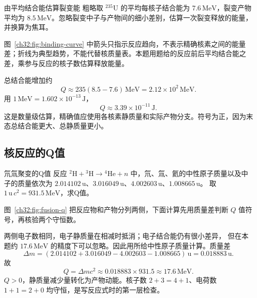 \begin{origexamplebox}{由平均结合能估算裂变能}
粗略取 $^{235}\mathrm U$ 的平均每核子结合能为 $7.6\,\mathrm{MeV}$，裂变产物平均为
$8.5\,\mathrm{MeV}$。忽略裂变中子与产物间的细小差别，估算一次裂变释放的能量，并换算为焦耳。
\end{origexamplebox}
\begin{xesolution}

\begin{center}

\label{ch32:fig:binding-curve}
\end{center}
图~\ref{ch32:fig:binding-curve} 中箭头只指示反应趋向，不表示精确核素之间的能量差；折线为典型趋势，不能代替核质量表。本题用题给的反应前后平均结合能之差，乘参与反应的核子数估算释放能量。


总结合能增加约
\[
 Q\approx235(8.5-7.6)\,\mathrm{MeV}
 =\boxed{2.12\times10^2\,\mathrm{MeV}}.
\]
用 $1\,\mathrm{MeV}=1.602\times10^{-13}\,\mathrm J$，
\[
 \boxed{Q\approx3.39\times10^{-11}\,\mathrm J}.
\]
这是数量级估算，精确值应使用各核素静质量和实际产物分支。符号为正，因为末态总结合能更大、总静质量更小。
\end{xesolution}

\subsection{核反应的Q值}

\begin{origexamplebox}{氘氚聚变的Q值}
反应 $^2\mathrm H+{}^3\mathrm H\to{}^4\mathrm{He}+n$ 中，氘、氚、氦的中性原子质量以及中子的质量依次为
$2.014102\,\mathrm u$、$3.016049\,\mathrm u$、$4.002603\,\mathrm u$、$1.008665\,\mathrm u$。
取 $1\,\mathrm u\,c^2=931.5\,\mathrm{MeV}$，求Q值。
\end{origexamplebox}
\begin{xesolution}

\begin{center}

\label{ch32:fig:fusion-q}
\end{center}
图~\ref{ch32:fig:fusion-q} 把反应物和产物分列两侧，下面计算先用质量差判断 $Q$ 值符号，再核验两个守恒数。


两侧电子数相同，电子静质量在相减时抵消；电子结合能仍有很小差异，
但在本题约 $17.6\,\mathrm{MeV}$ 的精度下可以忽略。因此用所给中性原子质量计算。质量差
\[
 \Delta m=(2.014102+3.016049-4.002603-1.008665)\,\mathrm u
 =0.018883\,\mathrm u.
\]
故
\[
 \boxed{Q=\Delta mc^2\approx0.018883\times931.5
 \approx17.6\,\mathrm{MeV}}.
\]
$Q>0$，静质量减少量转化为产物动能。核子数 $2+3=4+1$、电荷数 $1+1=2+0$ 均守恒，是写反应式时的第一层检查。
\end{xesolution}



